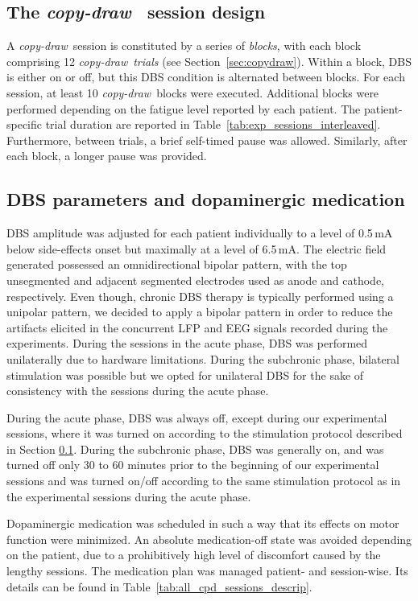 \documentclass[10pt,a4paper, twocolumn]{article}
\newcommand{\cpd}[0]{\textit{copy-draw}\xspace}
\begin{document}
\subsection{The \cpd~ session design}\label{sec:cpd_session_design}
A \cpd~session is constituted by a series of \textit{blocks}, with each block comprising 12 \cpd~\textit{trials} (see Section~\ref{sec:copydraw}). Within a block, DBS is either on or off, but this DBS condition is alternated between blocks. For each session, at least 10 \cpd~blocks were executed. Additional blocks were performed depending on the fatigue level reported by each patient. The patient-specific trial duration are reported in Table~\ref{tab:exp_sessions_interleaved}. Furthermore, between trials, a brief self-timed pause was allowed. Similarly, after each block, a longer pause was provided.

\subsection{DBS parameters and dopaminergic medication}
DBS amplitude was adjusted for each patient individually to a level of 0.5\,mA below side-effects onset but maximally at a level of 6.5\,mA. The electric field generated possessed an omnidirectional bipolar pattern, with the top unsegmented and adjacent segmented electrodes used as anode and cathode, respectively. Even though, chronic DBS therapy is typically performed using a unipolar pattern, we decided to apply a bipolar pattern in order to reduce the artifacts elicited in the concurrent LFP and EEG signals recorded during the experiments. During the sessions in the acute phase, DBS was performed unilaterally due to hardware limitations. During the subchronic phase, bilateral stimulation was possible but we opted for unilateral DBS for the sake of consistency with the sessions during the acute phase.

During the acute phase, DBS was always off, except during our experimental sessions, where it was turned on according to the stimulation protocol described in Section \ref{sec:cpd_session_design}. During the subchronic phase, DBS was generally on, and was turned off only 30 to 60 minutes prior to the beginning of our experimental sessions and was turned on/off according to the same stimulation protocol as in the experimental sessions during the acute phase.

Dopaminergic medication was scheduled in such a way that its effects on motor function were minimized. An absolute medication-off state was avoided depending on the patient, due to a prohibitively high level of discomfort caused by the lengthy sessions. The medication plan was managed patient- and session-wise. Its details can be found in Table~\ref{tab:all_cpd_sessions_descrip}.
\end{document}
